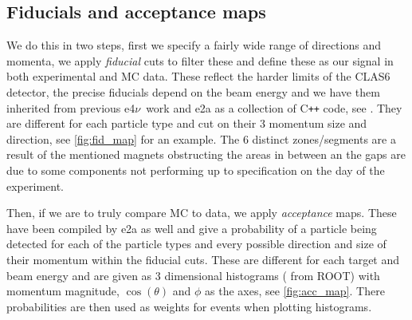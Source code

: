 \documentclass[a4paper,12pt]{article}
\newcommand{\efn}{e4$\nu$}
\newcommand{\verbb}[1]{\text{\verb|#1}}
\begin{document}
\subsection{Fiducials and acceptance maps}
We do this in two steps, first we specify a fairly wide range of directions and momenta, we apply \emph{fiducial} cuts to filter these and define these as our signal in both experimental and MC data.
These reflect the harder limits of the CLAS6 detector, the precise fiducials depend on the beam energy and we have them inherited from previous \efn\ work and e2a as a collection of C\texttt{++} code, see \cite{papadopoulouLeptonNucleusScatteringMeasurements2023,mclauchlanDeltaElectroproduction12C}.
They are different for each particle type and cut on their 3 momentum size and direction, see \cref{fig:fid_map} for an example.
The 6 distinct zones/segments are a result of the mentioned magnets obstructing the areas in between an the gaps are due to some components not performing up to specification on the day of the experiment.

Then, if we are to truly compare MC to data, we apply \emph{acceptance} maps.
These have been compiled by e2a as well and give a probability of a particle being detected for each of the particle types and every possible direction and size of their momentum within the fiducial cuts.
These are different for each target and beam energy and are given as 3 dimensional histograms (\verbb{TH3F} from ROOT) with momentum magnitude, $\cos(\theta)$ and $\phi$ as the axes, see \cref{fig:acc_map}.
There probabilities are then used as weights for events when plotting histograms.
\end{document}
